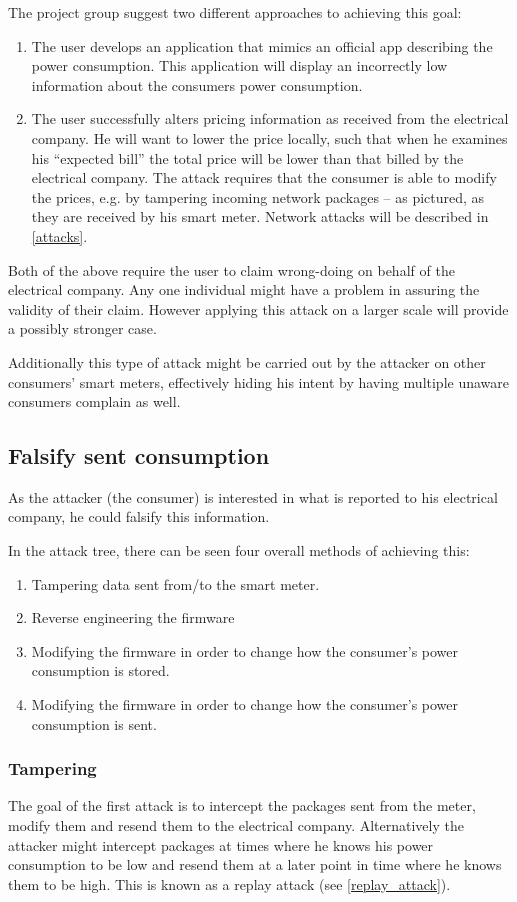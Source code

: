 The project group suggest two different approaches to achieving this goal:
\begin{enumerate}
  \item The user develops an application that mimics an official app describing the power consumption.
  This application will display an incorrectly low information about the consumers power consumption.
  \item The user successfully alters pricing information as received from the electrical company.
  He will want to lower the price locally, such that when he examines his ``expected bill'' the total price will be lower than that billed by the electrical company.
  The attack requires that the consumer is able to modify the prices, e.g. by tampering incoming network packages -- as pictured, as they are received by his smart meter.
  Network attacks will be described in \cref{attacks}.
\end{enumerate}
Both of the above require the user to claim wrong-doing on behalf of the electrical company.
Any one individual might have a problem in assuring the validity of their claim.
However applying this attack on a larger scale will provide a possibly stronger case.

Additionally this type of attack might be carried out by the attacker on other consumers' smart meters, effectively hiding his intent by having multiple unaware consumers complain as well.

\subsection{Falsify sent consumption}
As the attacker (the consumer) is interested in what is reported to his electrical company, he could falsify this information.

In the attack tree, there can be seen four overall methods of achieving this:
\begin{enumerate}
  \item Tampering data sent from/to the smart meter.
  \item Reverse engineering the firmware 
  \item Modifying the firmware in order to change how the consumer's power consumption is stored.
  \item Modifying the firmware in order to change how the consumer's power consumption is sent.
\end{enumerate}

\subsubsection{Tampering}
The goal of the first attack is to intercept the packages sent from the meter, modify them and resend them to the electrical company.
Alternatively the attacker might intercept packages at times where he knows his power consumption to be low and resend them at a later point in time where he knows them to be high.
This is known as a replay attack (see \cref{replay_attack}).

